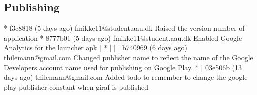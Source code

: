 \subsection{Publishing}
* f3c8818 (5 days ago) fmikke11@student.aau.dk Raised the version number of application
* 8777b01 (5 days ago) fmikke11@student.aau.dk Enabled Google Analytics for the launcher apk
| * | | | b740969 (6 days ago) thilemann@gmail.com Changed publisher name to reflect the name of the Google Developers account name used for publishing on Google Play.
* | 03e506b (13 days ago) thilemann@gmail.com Added todo to remember to change the google play publisher constant when giraf is published